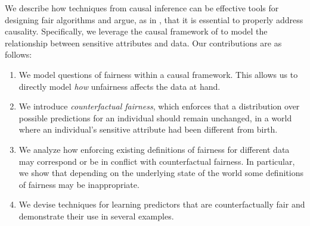 % 

We describe how techniques from causal inference can be effective tools for designing fair algorithms and argue, as in \citet{dedeo2014wrong}, that it is essential to properly address causality.
Specifically, we
leverage the causal framework of 
\citet{pearl2009causal} to model the relationship between sensitive
attributes and data. Our contributions are as follows:
\begin{enumerate}
    \item We model questions of fairness within a causal framework. This allows us to directly model \emph{how} unfairness affects the data at hand.
    \item We introduce \emph{counterfactual fairness}, which enforces that a distribution over possible predictions for an individual should remain unchanged, in a world where an individual's sensitive attribute had been different from birth.
    \item We analyze how enforcing existing definitions of fairness for different data may correspond or be in conflict with counterfactual fairness. In particular, we show that depending on the underlying state of the world some definitions of fairness may be inappropriate.
    \item We devise techniques for learning predictors that are counterfactually fair and demonstrate their use in several examples.
\end{enumerate}





